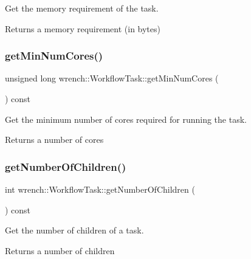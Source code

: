 Get the memory requirement of the task. 

\begin{DoxyReturn}{Returns}
a memory requirement (in bytes) 
\end{DoxyReturn}
\mbox{\label{classwrench_1_1_workflow_task_a05d06d1988745735016dcf19d38e2398}} 
\subsubsection{\texorpdfstring{get\+Min\+Num\+Cores()}{getMinNumCores()}}
{\footnotesize\ttfamily unsigned long wrench\+::\+Workflow\+Task\+::get\+Min\+Num\+Cores (\begin{DoxyParamCaption}{ }\end{DoxyParamCaption}) const}



Get the minimum number of cores required for running the task. 

\begin{DoxyReturn}{Returns}
a number of cores 
\end{DoxyReturn}
\mbox{\label{classwrench_1_1_workflow_task_a6d69d3c969a5cb32a3a53ec20fb6f6cb}} 
\subsubsection{\texorpdfstring{get\+Number\+Of\+Children()}{getNumberOfChildren()}}
{\footnotesize\ttfamily int wrench\+::\+Workflow\+Task\+::get\+Number\+Of\+Children (\begin{DoxyParamCaption}{ }\end{DoxyParamCaption}) const}



Get the number of children of a task. 

\begin{DoxyReturn}{Returns}
a number of children 
\end{DoxyReturn}
\mbox{\label{classwrench_1_1_workflow_task_ab0c0bc84347585a8ea8ca45251931304}} 
